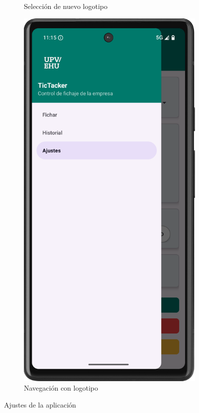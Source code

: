\begin{figure}[H]
\begin{subfigure}[b]{0.3\textwidth}
         \caption{Selección de nuevo logotipo}
         \label{fig:settings-2}
     \end{subfigure}
     \hfill
     \begin{subfigure}[b]{0.3\textwidth}
         \centering
         \includegraphics[width=\textwidth]{root/settings-3.png}
         \caption{Navegación con logotipo}
         \label{fig:settings-3}
     \end{subfigure}
        \caption{Ajustes de la aplicación}
        \label{fig:bienvenida}
\end{figure}

